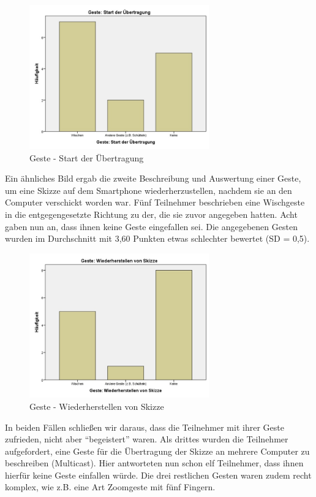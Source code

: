 \documentclass{chi-ext}
\begin{document}
\begin{figure}
  \centering
  \includegraphics[width=220pt]{img/studie/Antworten_Geste_Start_Uebertragung.jpg}
  \caption{Geste - Start der Übertragung}
  \label{fig:studie_Antworten_Geste_Start_Uebertragung}
\end{figure}


Ein ähnliches Bild ergab die zweite Beschreibung und Auswertung einer Geste, um eine Skizze auf dem Smartphone wiederherzustellen, nachdem sie an den Computer verschickt worden war. Fünf Teilnehmer beschrieben eine Wischgeste in die entgegengesetzte Richtung zu der, die sie zuvor angegeben hatten. Acht gaben nun an, dass ihnen keine Geste eingefallen sei. Die angegebenen Gesten wurden im Durchschnitt mit 3,60 Punkten etwas schlechter bewertet (SD = 0,5).

\begin{figure}
  \centering
  \includegraphics[width=220pt]{img/studie/Antworten_Geste_Wiederherstellen.jpg}
  \caption{Geste - Wiederherstellen von Skizze}
  \label{fig:studie_Antworten_Geste_Wiederherstellen}
\end{figure}


In beiden Fällen schließen wir daraus, dass die Teilnehmer mit ihrer Geste zufrieden, nicht aber “begeistert” waren.
Als drittes wurden die Teilnehmer aufgefordert, eine Geste für die Übertragung der Skizze an mehrere Computer zu beschreiben (Multicast). Hier antworteten nun schon elf Teilnehmer, dass ihnen hierfür keine Geste einfallen würde. Die drei restlichen Gesten waren zudem recht komplex, wie z.B. eine Art Zoomgeste mit fünf Fingern.
\end{document}
